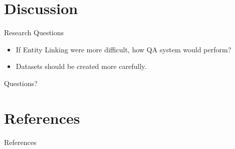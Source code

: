 \documentclass[]{beamer}
\begin{document}
\section{Discussion}
  \begin{frame}{\secname}
    \begin{alertblock}{Research Questions}
      \begin{itemize}
        \item If Entity Linking were more difficult, how QA system would perform?
        \item Datasets should be created more carefully.
      \end{itemize}
    \end{alertblock}
  \end{frame}

  \begin{frame}[standout]
    Questions?
  \end{frame}

\section{References}
\begin{frame}[allowframebreaks]{References}
  \printbibliography%
\end{frame}
\end{document}
